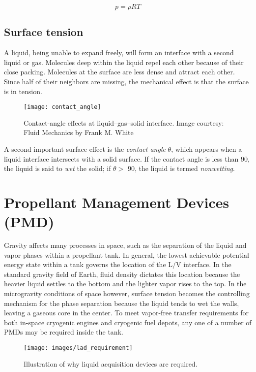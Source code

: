 \documentclass[12pt,twoside]{report}
\begin{document}
\begin{equation} \label{eq:2.7}
	p = \rho RT
\end{equation}

\subsection{Surface tension}
A liquid, being unable to expand freely, will form an interface with a second liquid
or gas. Molecules deep within the liquid repel each other because of their close packing. Molecules at the surface are less dense and attract each other. Since half of their neighbors are missing, the mechanical effect is that the surface is in tension. \par 

\begin{figure}[h]
	\centering
	\texttt{[image: contact\_angle]}
	\caption{Contact-angle effects at liquid–gas–solid interface. Image courtesy: Fluid Mechanics by Frank M. White}
	\label{fig:contact_angle}
\end{figure}

A second important surface effect is the \textit{contact angle} $\theta$, which appears when a
liquid interface intersects with a solid surface. If the contact angle is less than 90\degree, the liquid is said to \textit{wet} the solid; if $\theta >$ 90\degree, the liquid is termed \textit{nonwetting}. \cite{White}

\section{Propellant Management Devices (PMD)}
Gravity affects many processes in space, such as the separation of the liquid and vapor phases within a propellant tank. In general, the lowest achievable potential energy state within a tank governs the location of the L/V interface. In the standard gravity field of Earth, fluid density dictates this location because the heavier liquid settles to the bottom and the lighter vapor rises to the top. In the microgravity conditions of space however, surface tension becomes the controlling mechanism for the phase separation because the liquid tends to wet the walls, leaving a gaseous core in the center. To meet vapor-free transfer requirements for both in-space cryogenic engines and cryogenic fuel depots, any
one of a number of PMDs may be required inside the tank. \par

\begin{figure}[h]
	\centering
	\texttt{[image: images/lad\_requirement]}
	\caption{Illustration of why liquid acquisition devices are required.}
	\label{fig:ladrequirement}
\end{figure}
\end{document}
